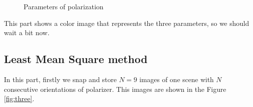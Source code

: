 \documentclass[english]{article}
\begin{document}
\begin{figure}[H]
	\centering
	\caption{Parameters of polarization}
	\label{fig:two}
\end{figure}

This part shows a color image that represents the three parameters, so we should wait a bit now.

\subsection{Least Mean Square method}
In this part, firstly we snap and store $N = 9$ images of one scene with $N$ consecutive orientations of polarizer. This images are shown in the Figure \ref{fig:three}.
\end{document}
